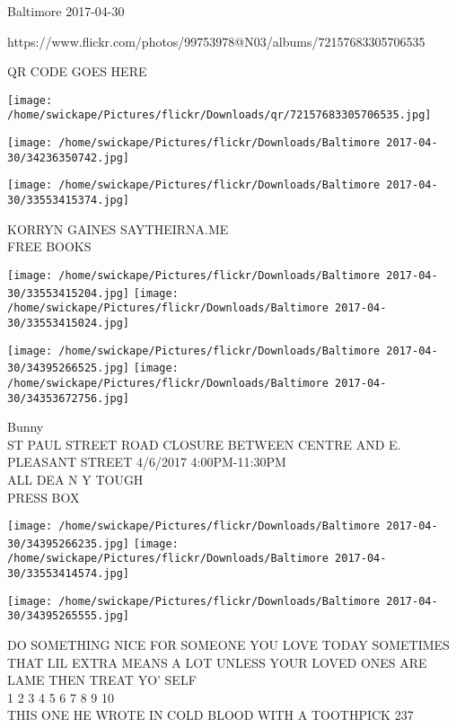 \documentclass[10pt,letterpaper]{article}
\begin{document}
Baltimore 2017-04-30

https://www.flickr.com/photos/99753978@N03/albums/72157683305706535

QR CODE GOES HERE

\texttt{[image: /home/swickape/Pictures/flickr/Downloads/qr/72157683305706535.jpg]}
\pagebreak

\texttt{[image: /home/swickape/Pictures/flickr/Downloads/Baltimore 2017-04-30/34236350742.jpg]}

\vspace{0.25in}
\texttt{[image: /home/swickape/Pictures/flickr/Downloads/Baltimore 2017-04-30/33553415374.jpg]}

KORRYN GAINES SAYTHEIRNA.ME\\
FREE BOOKS\\
\pagebreak

\texttt{[image: /home/swickape/Pictures/flickr/Downloads/Baltimore 2017-04-30/33553415204.jpg]}
\texttt{[image: /home/swickape/Pictures/flickr/Downloads/Baltimore 2017-04-30/33553415024.jpg]}

\texttt{[image: /home/swickape/Pictures/flickr/Downloads/Baltimore 2017-04-30/34395266525.jpg]}
\texttt{[image: /home/swickape/Pictures/flickr/Downloads/Baltimore 2017-04-30/34353672756.jpg]}

Bunny\\
ST PAUL STREET ROAD CLOSURE BETWEEN CENTRE AND E. PLEASANT STREET 4/6/2017 4:00PM{-}11:30PM\\
ALL DEA N Y TOUGH\\
PRESS BOX\\
\pagebreak

\texttt{[image: /home/swickape/Pictures/flickr/Downloads/Baltimore 2017-04-30/34395266235.jpg]}
\texttt{[image: /home/swickape/Pictures/flickr/Downloads/Baltimore 2017-04-30/33553414574.jpg]}

\texttt{[image: /home/swickape/Pictures/flickr/Downloads/Baltimore 2017-04-30/34395265555.jpg]}

DO SOMETHING NICE FOR SOMEONE YOU LOVE TODAY SOMETIMES THAT LIL EXTRA MEANS A LOT UNLESS YOUR LOVED ONES ARE LAME THEN TREAT YO' SELF\\
1 2 3 4 5 6 7 8 9 10\\
THIS ONE HE WROTE IN COLD BLOOD WITH A TOOTHPICK 237\\
\pagebreak
\end{document}
